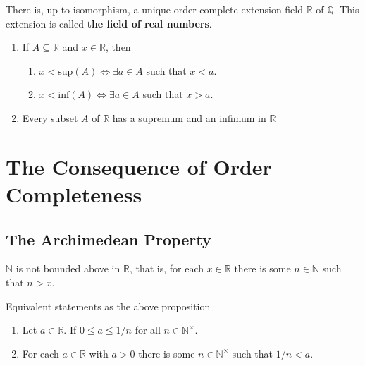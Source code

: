 \begin{theorem}
    There is, up to isomorphism, a unique order complete extension field \(\mathbb{R}\) of 
    \(\mathbb{Q}\). This extension is called \textbf{the field of real numbers}. 
\end{theorem}

\begin{proposition}  

    \begin{enumerate}[label=(\roman*)]
        Followed from natural order defined by \(\mathbb{R}\). 
        \item If \(A \subseteq \mathbb{R}\) and \(x \in \mathbb{R}\), then
        \begin{enumerate}
            \item \(x < \text{sup} \left( A \right) \Leftrightarrow  \exists a \in A  \) such that \(x < a\).
            \item  \(x < \text{inf} \left( A \right) \Leftrightarrow  \exists a \in A  \) such that \(x > a\).
        \end{enumerate}
        \item Every subset \(A\) of \(\mathbb{R}\) has a supremum and an infimum in \(\mathbb{R}\) 
    \end{enumerate}
\end{proposition}

\section{The Consequence of Order Completeness}

\subsection*{The Archimedean Property}

\begin{proposition}[Archimedes]
    \(\mathbb{N}\) is not bounded above in \(\mathbb{R}\), that is, for each \(x \in \mathbb{R}\)
    there is some \(n \in \mathbb{N}\) such that \(n > x\). 
\end{proposition}

\begin{corollary} Equivalent statements as the above proposition
    \begin{enumerate}[label=(\alph*)]
        \item Let \(a \in \mathbb{R}\). If \(0 \leq a \leq 1/n\) for all \(n \in \mathbb{N}^\times\).
        \item For each \(a \in \mathbb{R}\) with \(a > 0\) there is some \(n \in \mathbb{N}^\times\) such that \(1/n < a\). 
    \end{enumerate}
\end{corollary}

